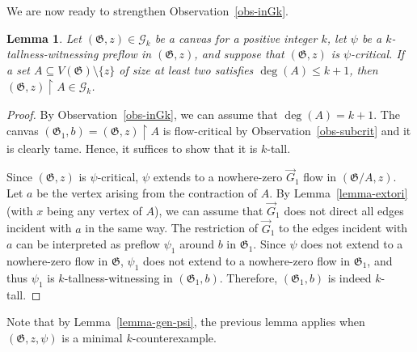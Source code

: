 \documentclass{article}
\newcommand{\GG}{\mathcal{G}}
\newcommand\g{\mathfrak{G}}
\newtheorem{lemma}[theorem]{Lemma}
\begin{document}
We are now ready to strengthen Observation~\ref{obs-inGk}.

\begin{lemma}\label{lemma-gen-sepx}
Let $(\g,z)\in \GG_k$ be a canvas for a positive integer $k$, let $\psi$ be a $k$-tallness-witnessing preflow in $(\g,z)$,
and suppose that $(\g,z)$ is $\psi$-critical.  If a set $A\subseteq V(\g)\setminus \{z\}$ of size at least two satisfies $\deg(A)\le k+1$,
then $(\g,z)\restriction A\in \GG_k$.
\end{lemma}
\begin{proof}
By Observation~\ref{obs-inGk}, we can assume that $\deg(A)=k+1$.
The canvas $(\g_1,b)=(\g,z)\restriction A$ is flow-critical by Observation~\ref{obs-subcrit} and it is clearly tame.
Hence, it suffices to show that it is $k$-tall.

Since $(\g,z)$ is $\psi$-critical, $\psi$ extends to a nowhere-zero $\vec{G}_1$ flow in $(\g/A,z)$.  Let $a$ be the vertex arising from the contraction of $A$.
By Lemma~\ref{lemma-extori} (with $x$ being any vertex of $A$), we can assume that $\vec{G}_1$ does not direct all edges incident with $a$ in the same way.
The restriction of $\vec{G}_1$ to the edges incident with $a$ can be interpreted as preflow $\psi_1$
around $b$ in $\g_1$. Since $\psi$ does not extend to a nowhere-zero flow in $\g$, $\psi_1$ does not extend to a nowhere-zero flow in $\g_1$,
and thus $\psi_1$ is $k$-tallness-witnessing in $(\g_1,b)$.  Therefore, $(\g_1,b)$ is indeed $k$-tall.
\end{proof}

Note that by Lemma~\ref{lemma-gen-psi}, the previous lemma applies when $(\g,z,\psi)$ is a minimal $k$-counter\-exam\-ple.
\end{document}
